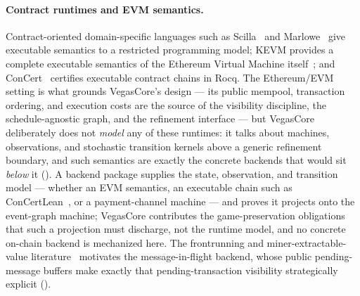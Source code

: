 \paragraph{Contract runtimes and EVM semantics.}
Contract-oriented domain-specific languages such as
Scilla~\citep{Sergey2019Scilla} and Marlowe~\citep{Lamela2020Marlowe} give
executable semantics to a restricted programming model; KEVM provides a
complete executable semantics of the Ethereum Virtual Machine
itself~\citep{Hildenbrandt2018KEVM}; and ConCert~\citep{Annenkov2020ConCert}
certifies executable contract chains in Rocq.  The Ethereum/EVM setting is what
grounds VegasCore's design --- its public mempool, transaction ordering, and
execution costs are the source of the visibility discipline, the
schedule-agnostic graph, and the refinement interface --- but VegasCore
deliberately does not \emph{model} any of these runtimes: it talks about
machines, observations, and stochastic transition kernels above a generic
refinement boundary, and such semantics are exactly the concrete backends that
would sit \emph{below} it
().  A backend package supplies
the state, observation, and transition model --- whether an EVM semantics, an
executable chain such as ConCertLean~\citep{GershuniConCertLean}, or a
payment-channel machine --- and proves it projects onto the event-graph
machine; VegasCore contributes the game-preservation obligations that such a
projection must discharge, not the runtime model, and no concrete on-chain
backend is mechanized here.  The frontrunning and miner-extractable-value
literature~\citep{Daian2020Flash} motivates the message-in-flight backend, whose
public pending-message buffers make exactly that pending-transaction visibility
strategically explicit ().
